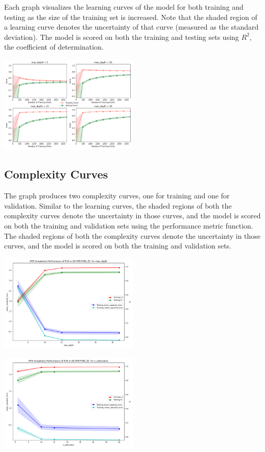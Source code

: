 \documentclass[a4project, twocolumn]{article}
\begin{document}
Each graph visualizes the learning curves of the model for both training and testing as the size of the training set is increased. Note that the shaded region of a learning curve denotes the uncertainty of that curve (measured as the standard deviation). The model is scored on both the training and testing sets using $R^2$, the coefficient of determination.  

\includegraphics[width=0.50\textwidth]{ModelLearning}\par\vspace{1cm}\label{p1}

\subsection{Complexity Curves}

The graph produces two complexity curves, one for training and one for validation. Similar to the learning curves, the shaded regions of both the complexity curves denote the uncertainty in those curves, and the model is scored on both the training and validation sets using the performance metric function. The shaded regions of both the complexity curves denote the uncertainty in those curves, and the model is scored on both the training and validation sets.

\includegraphics[width=0.50\textwidth]{ModelComplexity01}\par\vspace{1cm}\label{p2}

\includegraphics[width=0.50\textwidth]{ModelComplexity02}\par\vspace{1cm}\label{p3}
\end{document}
